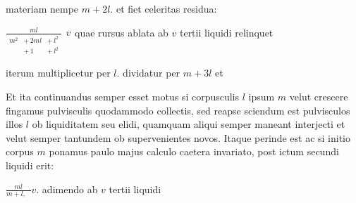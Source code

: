 materiam nempe 
$\displaystyle m + 2l$. et fiet celeritas residua: \rule[-4mm]{0mm}{10mm}$\displaystyle \frac{ml}{\begin{array}{lll} m^2 & + \, 2ml & + \, l^2\\ & +\, 1 & +\, l^2 \end{array}} \begin{array}{r}\!\!\!v \end{array}$quae rursus ablata ab $\displaystyle v$ tertii liquidi relinquet \rule[-4mm]{0mm}{10mm}
iterum multiplicetur per $\displaystyle l$. dividatur per $\displaystyle m + 3l$
et \rule[-4mm]{0mm}{10mm} Et ita continuandus semper esset motus si corpusculis $\displaystyle l$ ipsum $\displaystyle m$ velut crescere fingamus pulvisculis quodammodo collectis, sed 
reapse sciendum est pulvisculos illos $\displaystyle l$ ob liquiditatem seu 
elidi, quamquam aliqui semper maneant interjecti et velut semper tantundem ob supervenientes novos.
Itaque perinde est ac si initio corpus $\displaystyle m$ ponamus paulo majus calculo caetera invariato, 
post ictum secundi liquidi erit: \rule[-4mm]{0mm}{10mm}$\displaystyle \frac{ml}{m + l, \, \boxed{\phantom{\scriptstyle{2}}}} v$. adimendo ab $\displaystyle v$ 
tertii liquidi%
